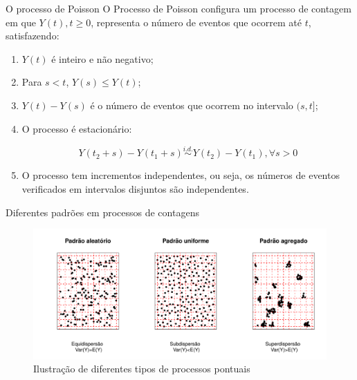 \documentclass[10pt, aspectratio=169]{beamer}\usepackage[]{graphicx}\usepackage[]{color}
\begin{document}
\begin{frame}{O processo de Poisson}
O Processo de Poisson configura um processo de contagem em que 
$Y(t),t\geqslant 0$, representa o número de eventos que ocorrem até $t$, 
satisfazendo:
\vspace{0,5cm}
\begin{enumerate}
  \item $Y(t)$ é inteiro e não negativo;
  \item Para $s<t$, $Y(s)\leq Y(t)$;
  \item $Y(t)-Y(s)$ é o número de eventos que ocorrem no intervalo $(s,t]$;
\item O processo é estacionário:

$$
  Y(t_{2}+s)-Y(t_{1}+s) \overset{i.d. }{\sim}Y(t_{2})-Y(t_{1}), \forall s>0
$$
  
\item O processo tem incrementos independentes, ou seja, os números de 
eventos verificados em intervalos disjuntos são independentes.
\end{enumerate}

\end{frame}

\begin{frame}{Diferentes padrões em processos de contagens}

\begin{figure}[h]
\includegraphics[scale=0.6]{images/processos14.pdf}
\caption{Ilustração de diferentes tipos de processos pontuais}
\label{Fig2}
\centering

\end{figure}
\end{frame}
\end{document}
